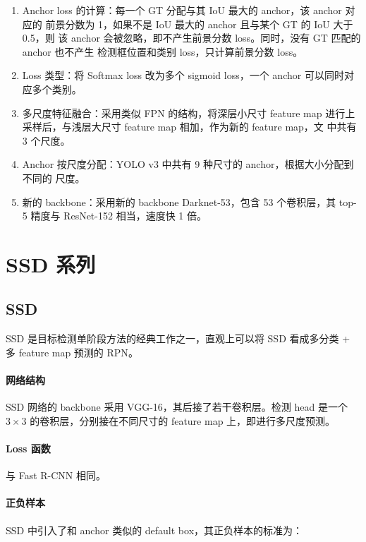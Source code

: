 \begin{enumerate}
  \item Anchor loss 的计算：每一个 GT 分配与其 IoU 最大的 anchor，该 anchor 对应的
    前景分数为 1，如果不是 IoU 最大的 anchor 且与某个 GT 的 IoU 大于 0.5，则
    该 anchor 会被忽略，即不产生前景分数 loss。同时，没有 GT 匹配的 anchor 也不产生
    检测框位置和类别 loss，只计算前景分数 loss。
  \item Loss 类型：将 Softmax loss 改为多个 sigmoid loss，一个 anchor 可以同时对
    应多个类别。
  \item 多尺度特征融合：采用类似 FPN\cite{2016-FPN} 的结构，将深层小尺寸 feature
    map 进行上采样后，与浅层大尺寸 feature map 相加，作为新的 feature map，文
    中共有 3 个尺度。
  \item Anchor 按尺度分配：YOLO v3 中共有 9 种尺寸的 anchor，根据大小分配到不同的
    尺度。
  \item 新的 backbone：采用新的 backbone Darknet-53，包含 53 个卷积层，其 top-5
    精度与 ResNet-152 相当，速度快 1 倍。
\end{enumerate}

\section{SSD 系列}
\label{sec:SSD}

\subsection{SSD}
\label{subsec:SSD}

SSD 是目标检测单阶段方法的经典工作之一，直观上可以将 SSD 看成多分类 + 多 feature
map 预测的 RPN\cite{2015-SSD}。

\paragraph{网络结构} 
SSD 网络的 backbone 采用 VGG-16，其后接了若干卷积层。检测 head 是一个 $3 \times
3$ 的卷积层，分别接在不同尺寸的 feature map 上，即进行多尺度预测。

\paragraph{Loss 函数}
与 Fast R-CNN 相同。

\paragraph{正负样本} 
SSD 中引入了和 anchor 类似的 default box，其正负样本的标准为：

